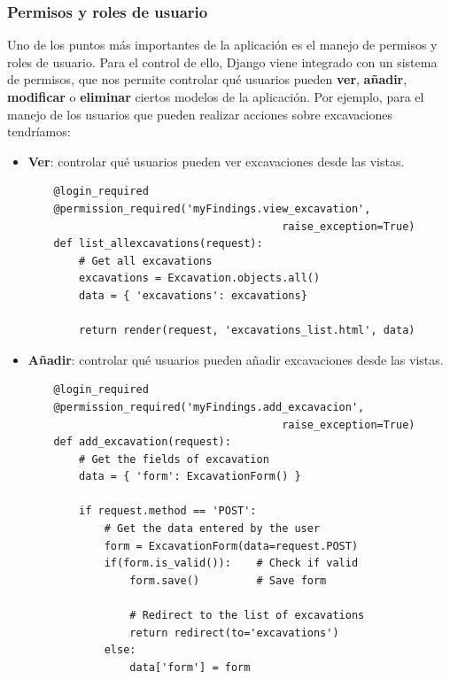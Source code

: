 \subsubsection{Permisos y roles de usuario}
Uno de los puntos más importantes de la aplicación es el manejo de permisos y roles de
usuario. Para el control de ello, Django viene integrado con un sistema de permisos,
que nos permite controlar qué usuarios pueden \textbf{ver}, \textbf{añadir}, \textbf{
modificar} o \textbf{eliminar} ciertos modelos de la aplicación. Por ejemplo, para el
manejo de los usuarios que pueden realizar acciones sobre excavaciones tendríamos:

    \begin{itemize}
        \item \textbf{Ver}: controlar qué usuarios pueden ver excavaciones desde las
        vistas.
    
    \begin{verbatim}
    @login_required
    @permission_required('myFindings.view_excavation', 
                                        raise_exception=True)
    def list_allexcavations(request):
        # Get all excavations
        excavations = Excavation.objects.all()
        data = { 'excavations': excavations}
    
        return render(request, 'excavations_list.html', data)
    \end{verbatim}

        \item \textbf{Añadir}: controlar qué usuarios pueden añadir excavaciones
        desde las vistas.
    
    \begin{verbatim}
    @login_required
    @permission_required('myFindings.add_excavacion', 
                                        raise_exception=True)
    def add_excavation(request):
        # Get the fields of excavation
        data = { 'form': ExcavationForm() }
    
        if request.method == 'POST':
            # Get the data entered by the user
            form = ExcavationForm(data=request.POST)
            if(form.is_valid()):    # Check if valid
                form.save()         # Save form
    
                # Redirect to the list of excavations
                return redirect(to='excavations')
            else:
                data['form'] = form
    

\end{verbatim}
\end{itemize}
